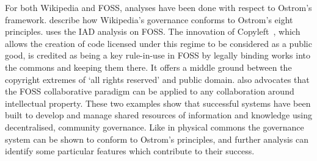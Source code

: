 For both Wikipedia and \ac{FOSS}, analyses have been done with respect to Ostrom's framework. 
 describe how Wikipedia's governance conforms to Ostrom's eight principles. 
 uses the \ac{IAD} analysis on \ac{FOSS}. The innovation of Copyleft~\citep{Stallman1999}, which allows the creation of code licensed under this regime to be considered as a public good, is credited as being a key rule-in-use in \ac{FOSS} by legally binding works into the commons and keeping them there. 
It offers a middle ground between the copyright extremes of `all rights reserved' and public domain. 
 also advocates that the \ac{FOSS} collaborative paradigm can be applied to any collaboration around intellectual property. 
These two examples show that successful systems have been built to develop and manage shared resources of information and knowledge using decentralised, community governance. 
Like in physical commons the governance system can be shown to conform to Ostrom's principles, and further analysis can identify some particular features which contribute to their success.






%

